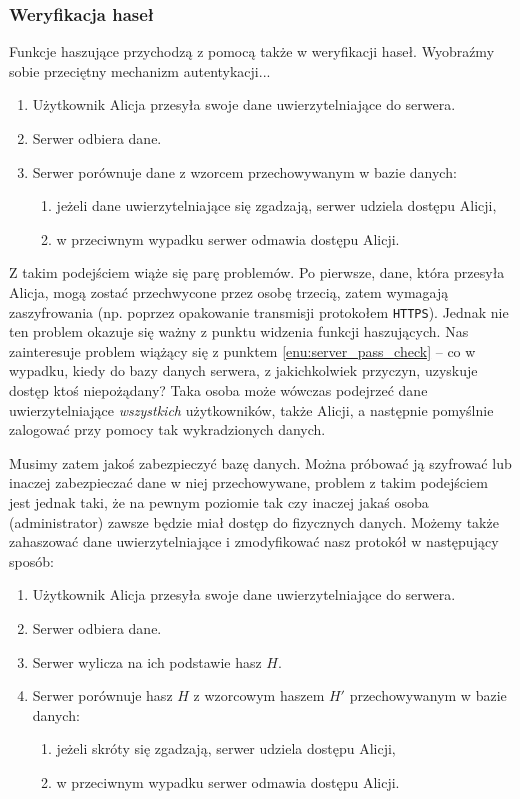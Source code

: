 \documentclass[12pt,a4paper,twoside]{article}
\begin{document}
\subsubsection{Weryfikacja haseł}
Funkcje haszujące przychodzą z pomocą także w weryfikacji haseł. Wyobraźmy
sobie przeciętny mechanizm autentykacji...

\begin{enumerate}
\item Użytkownik Alicja przesyła swoje dane uwierzytelniające do serwera.
\item Serwer odbiera dane.
\item Serwer porównuje dane z wzorcem przechowywanym w bazie danych:
\label{enu:server_pass_check}
    \begin{enumerate}[label*=\arabic*.]
    \item jeżeli dane uwierzytelniające się zgadzają, serwer udziela dostępu
    Alicji,
    \item w przeciwnym wypadku serwer odmawia dostępu Alicji.
    \end{enumerate}
\end{enumerate}

Z takim podejściem wiąże się parę problemów. Po pierwsze, dane, która przesyła
Alicja, mogą zostać przechwycone przez osobę trzecią, zatem wymagają
zaszyfrowania (np. poprzez opakowanie transmisji protokołem \texttt{HTTPS}).
Jednak nie ten problem okazuje się ważny z punktu widzenia funkcji haszujących.
Nas zainteresuje problem wiążący się z punktem \ref{enu:server_pass_check} --
co w wypadku, kiedy do bazy danych serwera, z jakichkolwiek przyczyn, uzyskuje
dostęp ktoś niepożądany? Taka osoba może wówczas podejrzeć dane
uwierzytelniające \emph{wszystkich} użytkowników, także Alicji, a następnie
pomyślnie zalogować przy pomocy tak wykradzionych danych.

Musimy zatem jakoś zabezpieczyć bazę danych. Można próbować ją szyfrować lub
inaczej zabezpieczać dane w niej przechowywane, problem z takim podejściem jest
jednak taki, że na pewnym poziomie tak czy inaczej jakaś osoba (administrator)
zawsze będzie miał dostęp do fizycznych danych. Możemy także zahaszować dane
uwierzytelniające i zmodyfikować nasz protokół w następujący sposób:

\begin{enumerate}
\item Użytkownik Alicja przesyła swoje dane uwierzytelniające do serwera.
\item Serwer odbiera dane.
\item Serwer wylicza na ich podstawie hasz $H$.
\item Serwer porównuje hasz $H$ z wzorcowym haszem $H'$ przechowywanym w bazie
danych:
    \begin{enumerate}[label*=\arabic*.]
    \item jeżeli skróty się zgadzają, serwer udziela dostępu
    Alicji,
    \item w przeciwnym wypadku serwer odmawia dostępu Alicji.
    \end{enumerate}
\end{enumerate}
\end{document}
